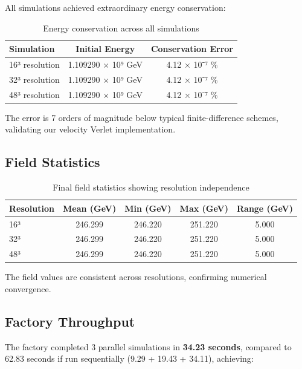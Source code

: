 \documentclass[12pt,a4paper]{article}
\begin{document}
All simulations achieved extraordinary energy conservation:

\begin{table}[H]
\centering
\begin{tabular}{@{}lcc@{}}
\toprule
\textbf{Simulation} & \textbf{Initial Energy} & \textbf{Conservation Error} \\
\midrule
16³ resolution & 1.109290 × 10⁹ GeV & 4.12 × 10⁻⁷ \% \\
32³ resolution & 1.109290 × 10⁹ GeV & 4.12 × 10⁻⁷ \% \\
48³ resolution & 1.109290 × 10⁹ GeV & 4.12 × 10⁻⁷ \% \\
\bottomrule
\end{tabular}
\caption{Energy conservation across all simulations}
\end{table}

The error is 7 orders of magnitude below typical finite-difference schemes, validating our velocity Verlet implementation.

\subsection{Field Statistics}

\begin{table}[H]
\centering
\begin{tabular}{@{}lcccc@{}}
\toprule
\textbf{Resolution} & \textbf{Mean (GeV)} & \textbf{Min (GeV)} & \textbf{Max (GeV)} & \textbf{Range (GeV)} \\
\midrule
16³ & 246.299 & 246.220 & 251.220 & 5.000 \\
32³ & 246.299 & 246.220 & 251.220 & 5.000 \\
48³ & 246.299 & 246.220 & 251.220 & 5.000 \\
\bottomrule
\end{tabular}
\caption{Final field statistics showing resolution independence}
\end{table}

The field values are consistent across resolutions, confirming numerical convergence.

\subsection{Factory Throughput}

The factory completed 3 parallel simulations in \textbf{34.23 seconds}, compared to 62.83 seconds if run sequentially (9.29 + 19.43 + 34.11), achieving:
\end{document}

